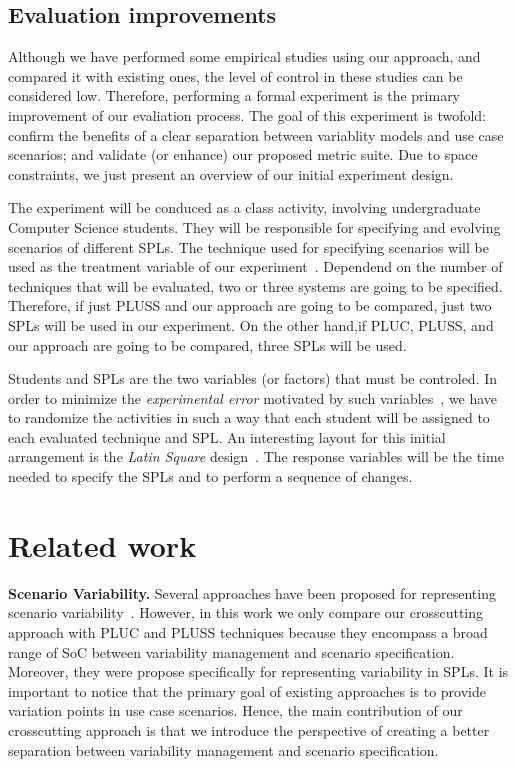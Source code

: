 \documentclass[times, 11pt,twocolumn]{article}
\begin{document}
\subsection{Evaluation improvements}\label{sub:eval-improvments}

Although we have performed some empirical studies using our approach, and
compared it with existing ones, the level of control in these studies can be
considered low. Therefore, performing a formal experiment is the primary
improvement of our evaliation process. The goal of this experiment is twofold:
confirm the benefits of a clear separation between variablity models and use
case scenarios; and validate (or enhance) our proposed metric suite. Due to
space constraints, we just present an overview of our initial experiment design.

The experiment will be conduced as a class activity, involving undergraduate
Computer Science students. They will be responsible for specifying and evolving
scenarios of different SPLs. The technique used for specifying scenarios will be
used as the treatment variable of our experiment~\cite{Pfleeger:1994aa}.
Dependend on the number of techniques that will be evaluated, two or three
systems are going to be specified. Therefore, if just PLUSS and our approach are
going to be compared, just two SPLs will be used in our experiment. On the other
hand,if PLUC, PLUSS, and our approach are going to be compared, three SPLs
will be used.

Students and SPLs are the two variables (or factors) that must be controled. In
order to minimize the \emph{experimental error} motivated by such
variables~\cite{Pfleeger:1994aa}, we have to randomize the activities in such a
way that each student will be assigned to each evaluated technique and SPL. An
interesting layout for this initial arrangement is the \emph{Latin Square}
design~\cite{Box:2004aa}. The response variables will be the time needed to
specify the SPLs and to perform a sequence of changes.

\section{Related work}\label{sec:related}


{\bf Scenario Variability.} Several approaches have been proposed for
representing scenario variability~\cite{Jacobson:1997aa, Griss:1998aa,
Eriksson:2005aa,Bertolino:2003aa}. However, in this work we only compare our
crosscutting approach with PLUC and PLUSS techniques because they encompass a
broad range of SoC between variability management and scenario specification.
Moreover, they were propose specifically for representing variability in SPLs. It
is important to notice that the primary goal of existing approaches is to provide
variation points in use case scenarios. Hence, the main contribution of our
crosscutting approach is that we introduce the perspective of creating a better
separation between variability management and scenario specification.
 
\end{document}
